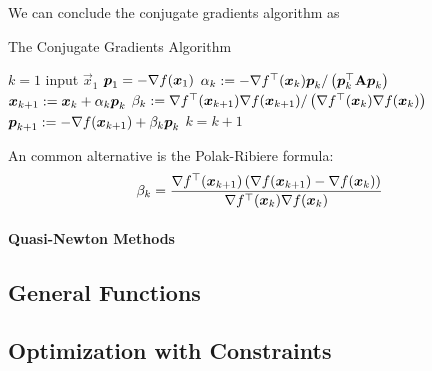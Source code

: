 We can conclude the conjugate gradients algorithm as
\begin{algorithm}[H]
	\caption{The Conjugate Gradients Algorithm}
	\begin{algorithmic}
		\State $k=1$
		\State input $\vec{x}_1$
		\State $\boldsymbol{p}_1=-\nabla f(\boldsymbol{x}_1)$
			\State $\alpha_k:=-\nabla f^\top(\boldsymbol{x}_k)\boldsymbol{p}_k/\left(\boldsymbol{p}_k^\top\mathbf{A}\boldsymbol{p}_k\right)$
			\State $\boldsymbol{x}_{k+1}:=\boldsymbol{x}_k+\alpha_k\boldsymbol{p}_k$
			\State $\beta_k:=\nabla f^\top(\boldsymbol{x}_{k+1})\nabla f(\boldsymbol{x}_{k+1})/\left(\nabla f^\top(\boldsymbol{x}_k)\nabla f(\boldsymbol{x}_k)\right)$
			\State $\boldsymbol{p}_{k+1}:=-\nabla f(\boldsymbol{x}_{k+1})+\beta_k\boldsymbol{p}_k$
			\State $k=k+1$
		\EndWhile
	\end{algorithmic}
\end{algorithm}
An common alternative is the Polak-Ribiere formula:
\begin{align*}
	\beta_k=\frac{\nabla f^\top(\boldsymbol{x}_{k+1})\left(\nabla f(\boldsymbol{x}_{k+1})-\nabla f(\boldsymbol{x}_k)\right)}{\nabla f^\top(\boldsymbol{x}_k)\nabla f(\boldsymbol{x}_k)}
\end{align*}

\paragraph{Quasi-Newton Methods}

\subsection{General Functions}

\subsection{Optimization with Constraints}